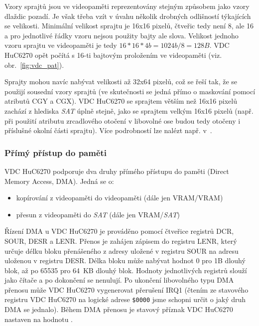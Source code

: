 Vzory sprajtů jsou ve videopaměti reprezentovány stejným způsobem jako vzory
dlaždic pozadí. Je však třeba vzít v úvahu několik drobných odlišností
týkajících se velikosti. Minimální velikost sprajtu je 16x16 pixelů, čtveřic
tedy není 8, ale 16 a pro jednotlivé řádky vzoru nejsou použity bajty ale
slova. Velikost jednoho vzoru sprajtu ve videopaměti je tedy $16 * 16 * 4b =
1024b / 8 = 128B$. VDC HuC6270 opět počítá s 16-ti bajtovým proložením ve
videopaměti (viz. obr.~\ref{fig:vdc_pat}).

Sprajty mohou navíc nabývat velikosti až 32x64 pixelů, což se řeší tak, že se
použijí sousední vzory sprajtů (ve skutečnosti se jedná přímo o maskování
pomocí atributů CGY a CGX). VDC HuC6270 se sprajtem větším než 16x16 pixelů
zachází z hlediska {\it SAT} úplně stejně, jako se sprajtem velkým 16x16 pixelů
(např. při použití atributu zrcadlového otočení v libovolné ose budou tedy
otočeny i příslušné okolní části sprajtu). Více podrobností lze nalézt např.
v~\cite{MacDonald02}.


\subsubsection{Přímý přístup do paměti}\label{chap:spec_hw_vdc_dma}

VDC HuC6270 podporuje dva druhy přímého přístupu do paměti (Direct Memory
Access, DMA). Jedná se o:

\begin{itemize}
\item kopírování z videopaměti do videopaměti (dále jen VRAM/VRAM)
\item přesun z videopaměti do {\it SAT} (dále jen VRAM/{\it SAT})
\end{itemize}

Řízení DMA u VDC HuC6270 je prováděno pomocí čtveřice registrů {\sf DCR}, {\sf
SOUR}, {\sf DESR} a {\sf LENR}. Přenos je zahájen zápisem do registru {\sf
LENR}, který určuje délku bloku přenášeného z adresy uložené v registru {\sf
SOUR} na adresu uloženou v registru {\sf DESR}. Délka bloku může nabývat hodnot
0 pro 1B dlouhý blok, až po 65535 pro 64~KB dlouhý blok. Hodnoty jednotlivých
registrů slouží jako čítače a po dokončení se nenulují. Po ukončení libovolného
typu DMA přenosu může VDC HuC6270 vygenerovat přerušení IRQ1 (čtením ze
stavového registru VDC HuC6270 na logické adrese {\tt \$0000} jsme schopni
určit o jaký druh DMA se jednalo). Během DMA přenosu je stavový příznak VDC
HuC6270  nastaven na hodnotu .


